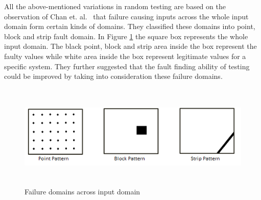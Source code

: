All the above-mentioned variations in random testing are based on the observation of Chan et. al.~\cite{Chan1996} that failure causing inputs across the whole input domain form certain kinds of domains. They classified these domains into point, block and strip fault domain. In Figure \ref{fig:patterns} the square box represents the whole input domain. The black point, block and strip area inside the box represent the faulty values while white area inside the box represent legitimate values for a specific system. They further suggested that the fault finding ability of testing could be improved by taking into consideration these failure domains.

\begin{figure}[h]
\centering
\includegraphics[width=14cm,height=5cm]{chapter5/ART_Patterns.png}
\caption{Failure domains across input domain~\cite{Chan1996}}
\label{fig:patterns}
\end{figure}






